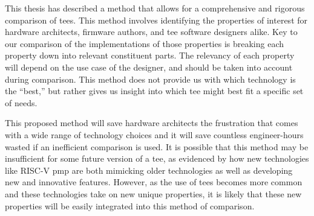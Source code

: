 This thesis has described a method that allows for a comprehensive and rigorous comparison of \glspl{tee}. This method involves identifying the properties of interest for hardware architects, firmware authors, and \gls{tee} software designers alike. Key to our comparison of the implementations of those properties is breaking each property down into relevant constituent parts. The relevancy of each property will depend on the use case of the designer, and should be taken into account during comparison. This method does not provide us with which technology is the ``best,'' but rather gives us insight into which \gls{tee} might best fit a specific set of needs.

This proposed method will save hardware architects the frustration that comes with a wide range of technology choices and it will save countless engineer-hours wasted if an inefficient comparison is used. It is possible that this method may be insufficient for some future version of a \gls{tee}, as evidenced by how new technologies like RISC-V \gls{pmp} are both mimicking older technologies as well as developing new and innovative features. However, as the use of \glspl{tee} becomes more common and these technologies take on new unique properties, it is likely that these new properties will be easily integrated into this method of comparison.